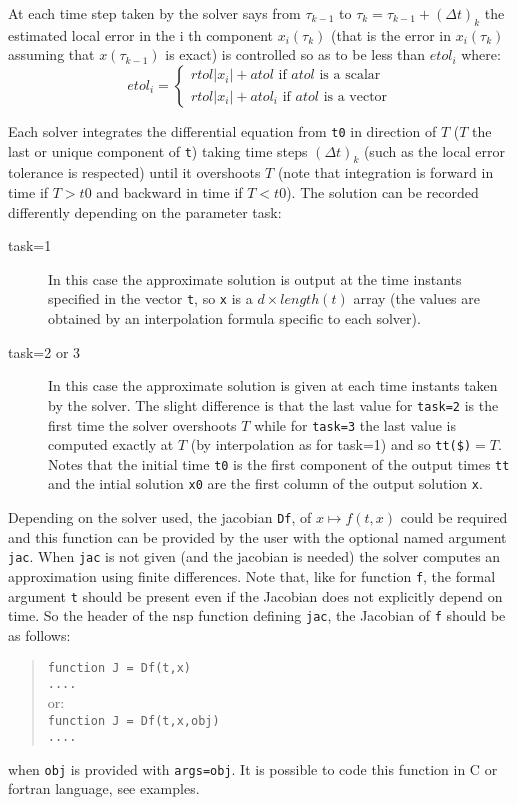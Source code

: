 \begin{mandescription}
At each time step taken by the solver says from $\tau_{k-1}$ to  $\tau_k = \tau_{k-1} + (\Delta t)_k$
the estimated local error in the i th component $x_i(\tau_k)$ (that is the error in 
$x_i(\tau_k)$ assuming that $x(\tau_{k-1})$ is exact) is controlled so as to be less 
than $etol_i$ where:
$$
etol_i =
\left\{
\begin{array}{l}
 rtol | x_i | + atol  \mbox{ if } atol \mbox { is a scalar} \\
 rtol | x_i | + atol_i  \mbox{ if } atol \mbox { is a vector}
\end{array}
\right.
$$

Each solver integrates the differential equation from \verb+t0+ in
direction of $T$ ($T$ the last or unique component of \verb+t+) taking 
time steps $(\Delta t)_k$ (such as the local error tolerance is respected) 
until it overshoots $T$ (note that integration is forward in time if 
$T>t0$ and backward in time if $T<t0$). The solution can be recorded
differently depending on the parameter task:
\begin{description}
\item[task=1] In this case the approximate solution is output
at the time instants specified in the vector {\tt t}, so \verb+x+ is
a $d \times length(t)$ array (the values are obtained by an interpolation
formula specific to each solver).

\item[task=2 or 3] In this case the approximate solution is given at each
time instants taken by the solver. The slight difference is that the last
value for \verb+task=2+ is the first time the solver overshoots $T$
while for \verb+task=3+ the last value is computed exactly at  $T$
(by interpolation as for task=1) and so \verb+tt($)+$=T$. Notes that the 
initial time \verb+t0+ is the first component of the output times \verb+tt+
and the intial solution \verb+x0+ are the first column of the output
solution \verb+x+.    
\end{description}

 Depending on the solver used, the jacobian 
\verb+Df+, of $x \mapsto f(t,x)$ could be required and this function can be 
provided by the user with the optional named argument \verb+jac+. When 
\verb+jac+ is not given (and the jacobian is needed) the solver computes an 
approximation using finite differences. Note that, like for function \verb+f+, 
the formal argument \verb+t+ should be present even if
the Jacobian does not explicitly depend on time. So the header of
the nsp function defining \verb+jac+, the Jacobian of \verb+f+ should be as follows:
\begin{quote}
{\tt function J = Df(t,x) \\
      ....}\\
or:\\
{\tt function J = Df(t,x,obj) \\
     ....}
\end{quote}
when {\tt obj} is provided with {\tt args=obj}.
It is possible to code this function in C or fortran language, see examples. 


\end{mandescription}
